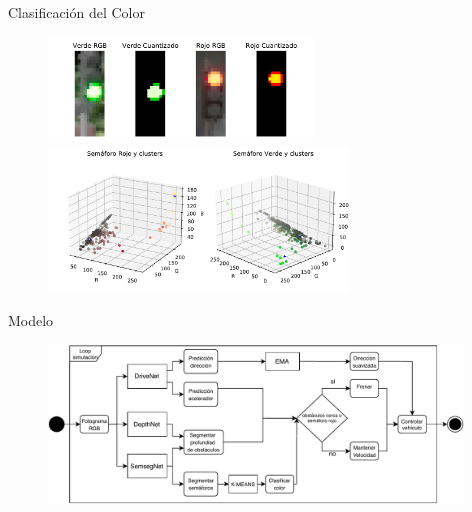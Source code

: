 \documentclass[10pt, usepdftitle=false]{beamer}
\begin{document}


\begin{frame}[fragile]{Clasificación del Color}
	\begin{figure}[H]
		\captionsetup{labelformat=empty}
		\centering
		\includegraphics[width=7cm]{imagenes/sign}
		
		\includegraphics[width=8cm]{imagenes/sign_3d}
	\end{figure}
\end{frame}

\begin{frame}[fragile]{Modelo}
	\begin{figure}[H]
		\captionsetup{labelformat=empty}
		\centering
		\includegraphics[width=11cm]{imagenes/arquitectura_inferencia}
	\end{figure}
\end{frame}
\end{document}
